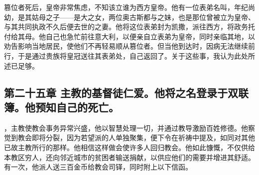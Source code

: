 篡位者死后，皇帝非常焦虑，不知该立谁为西方皇帝。他有一位表弟名叫，年纪尚幼，是其姑母之子——是大之女，两位奥古斯都与之妹，也是那位曾被立为皇帝、与其共同执政不久后便去世的之妻。他将这位表弟封为凯撒，派往西方，将政务托付给其母。他自己也急忙前往意大利，以便亲自立表弟为皇帝，同时亲临其地，以劝告影响当地居民，使他们不再轻易顺从篡位者。但当他到达时，因病无法继续前行，于是通过贵族将皇冠送往其表弟处，自己返回了。关于这些事，我认为此处所述已足够。\par


\subsection{第二十五章 主教的基督徒仁爱。他将之名登录于双联簿。他预知自己的死亡。}

，主教使教会事务异常兴盛，他以智慧处理一切，并通过教导激励百姓修德。他察觉到教会即将分裂，因为若望派的人单独聚集，便下令在祈祷中提及，如同对其他已故主教所行的那样。他相信这样做会使许多人回归教会。他如此慷慨，不仅供给本教区穷人，还向邻近城市的贫困者输送捐献，以供应他们的需要并增进其舒适。有一次，他派人送三百金币给教会司铎，同时附上以下信函。\par

\par

\par

